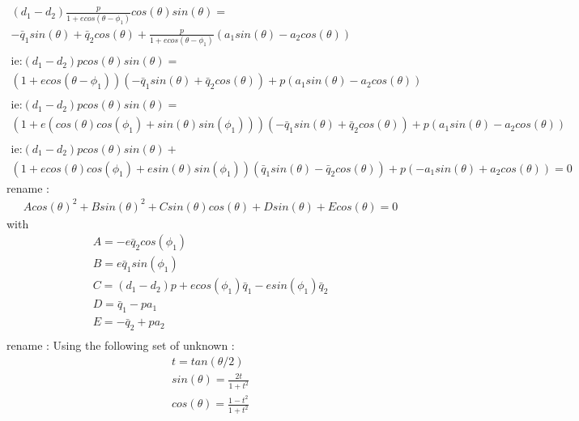 \begin{equation}
\label{eq_quartic12}
\begin{array}{l}
(d_1-d_2)\frac{p}{1+ecos(\theta - \phi_1)}cos(\theta )sin(\theta )=\\-\bar q_1sin(\theta )+\bar q_2cos(\theta )+\frac{p}{1+ecos(\theta - \phi_1)}(a_1  sin(\theta )-a_2 cos(\theta ))\\\\
\textrm{ie:}(d_1-d_2)pcos(\theta )sin(\theta )=\\(1+ecos(\theta - \phi_1))(-\bar q_1sin(\theta )+\bar q_2cos(\theta ))+p(a_1  sin(\theta )-a_2 cos(\theta ))\\\\
\textrm{ie:}(d_1-d_2)pcos(\theta )sin(\theta )=\\(1+e(cos(\theta)cos(\phi_1)+sin(\theta)sin(\phi_1)))(-\bar q_1sin(\theta )+\bar q_2cos(\theta ))+p(a_1  sin(\theta )-a_2 cos(\theta ))\\\\
\textrm{ie:}(d_1-d_2)pcos(\theta )sin(\theta )+\\(1+ecos(\theta)cos(\phi_1)+esin(\theta)sin(\phi_1))(\bar q_1sin(\theta )-\bar q_2cos(\theta ))+p(-a_1  sin(\theta )+a_2 cos(\theta ))=0
 \end{array}
\end{equation}
rename :
\begin{equation}
\label{eq_quartic13}
\begin{array}{l}
Acos(\theta )^2+Bsin(\theta)^2+Csin(\theta )cos(\theta )+Dsin(\theta )+Ecos(\theta )=0
 \end{array}
\end{equation}
with
\begin{equation}
\label{eq_quartic12}
\begin{array}{l}
A=- e\bar q_2cos(\phi_1)\\
B=e \bar q_1sin(\phi_1)\\
C=(d_1-d_2)p+ecos(\phi_1)\bar q_1-esin(\phi_1)\bar q_2\\
D=\bar q_1-pa_1\\
E=-\bar q_2+pa_2\\
\end{array}
\end{equation}
rename :
Using the following set of unknown :
\begin{equation}
\label{eq_quartic14}
\begin{array}{l}
t=tan(\theta /2)\\
sin(\theta )=\frac{2t}{1+t^2}\\
cos(\theta )=\frac{1-t^2}{1+t^2}
 \end{array}
\end{equation}
